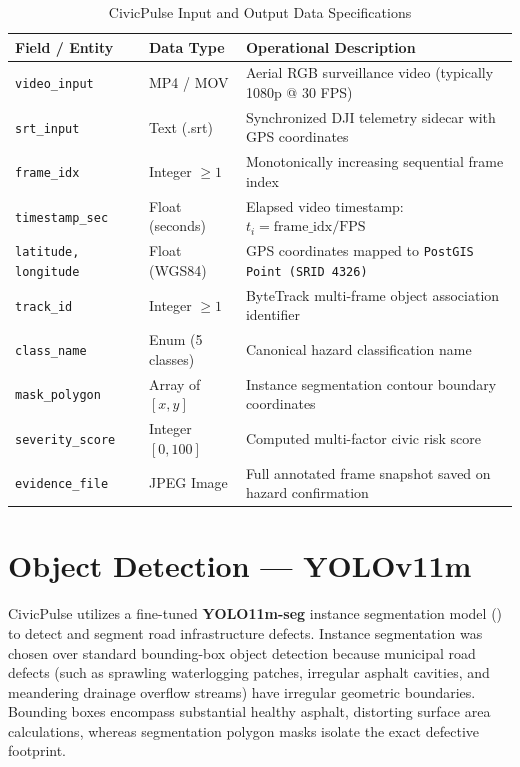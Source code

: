 \documentclass[12pt,a4paper]{article}
\begin{document}
\begin{table}[htbp]
\centering
\small
\caption{CivicPulse Input and Output Data Specifications}
\label{tab:data_spec}
\begin{tabularx}{\textwidth}{l l X}
\toprule
\textbf{Field / Entity} & \textbf{Data Type} & \textbf{Operational Description} \\
\midrule
\texttt{video\_input} & MP4 / MOV & Aerial RGB surveillance video (typically 1080p @ 30 FPS) \\
\texttt{srt\_input} & Text (.srt) & Synchronized DJI telemetry sidecar with GPS coordinates \\
\texttt{frame\_idx} & Integer $\ge 1$ & Monotonically increasing sequential frame index \\
\texttt{timestamp\_sec} & Float (seconds) & Elapsed video timestamp: $t_i = \text{frame\_idx} / \text{FPS}$ \\
\texttt{latitude, longitude} & Float (WGS84) & GPS coordinates mapped to \texttt{PostGIS Point (SRID 4326)} \\
\texttt{track\_id} & Integer $\ge 1$ & ByteTrack multi-frame object association identifier \\
\texttt{class\_name} & Enum (5 classes) & Canonical hazard classification name \\
\texttt{mask\_polygon} & Array of $[x, y]$ & Instance segmentation contour boundary coordinates \\
\texttt{severity\_score} & Integer $[0, 100]$ & Computed multi-factor civic risk score \\
\texttt{evidence\_file} & JPEG Image & Full annotated frame snapshot saved on hazard confirmation \\
\bottomrule
\end{tabularx}
\end{table}

\section{Object Detection --- YOLOv11m}

CivicPulse utilizes a fine-tuned \textbf{YOLO11m-seg} instance segmentation model () to detect and segment road infrastructure defects. Instance segmentation was chosen over standard bounding-box object detection because municipal road defects (such as sprawling waterlogging patches, irregular asphalt cavities, and meandering drainage overflow streams) have irregular geometric boundaries. Bounding boxes encompass substantial healthy asphalt, distorting surface area calculations, whereas segmentation polygon masks isolate the exact defective footprint.
\end{document}
